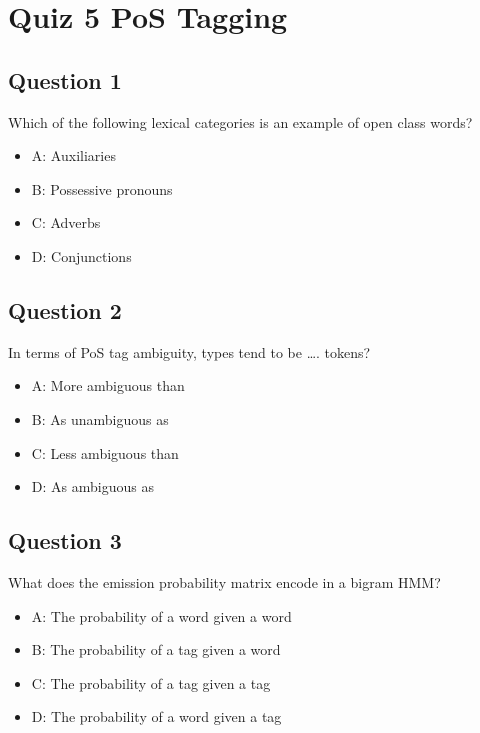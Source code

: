 \documentclass[
  11pt,
  british,
]{article}
\providecommand{\tightlist}{%
  \setlength{\itemsep}{0pt}\setlength{\parskip}{0pt}}
\begin{document}
\hypertarget{quiz-5-pos-tagging}{%
\section{Quiz 5 PoS Tagging}\label{quiz-5-pos-tagging}}

\hypertarget{question-1-4}{%
\subsection{Question 1}\label{question-1-4}}

Which of the following lexical categories is an example of open class
words?

\begin{itemize}
\tightlist
\item
  A: Auxiliaries
\item
  B: Possessive pronouns
\item
  C: Adverbs
\item
  D: Conjunctions
\end{itemize}

\hypertarget{question-2-4}{%
\subsection{Question 2}\label{question-2-4}}

In terms of PoS tag ambiguity, types tend to be \ldots. tokens?

\begin{itemize}
\tightlist
\item
  A: More ambiguous than
\item
  B: As unambiguous as
\item
  C: Less ambiguous than
\item
  D: As ambiguous as
\end{itemize}

\hypertarget{question-3-4}{%
\subsection{Question 3}\label{question-3-4}}

What does the emission probability matrix encode in a bigram HMM?

\begin{itemize}
\tightlist
\item
  A: The probability of a word given a word
\item
  B: The probability of a tag given a word
\item
  C: The probability of a tag given a tag
\item
  D: The probability of a word given a tag
\end{itemize}
\end{document}
